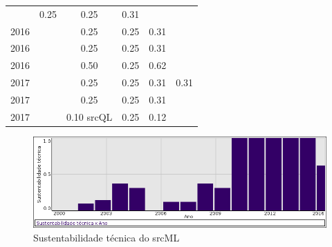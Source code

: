 \begin{table}[H]
\begin{tabular}{| l | c | c | c | c | c |}
          &
          0.25
          &
          0.25
          &
          0.31
          &
          \\
            2016
          &
          
          &
          0.25
          &
          0.25
          &
          0.31
          &
          \\
            2016
          &
          
          &
          0.25
          &
          0.25
          &
          0.31
          &
          \\
            2016
          &
          
          &
          0.50
          &
          0.25
          &
          0.62
          &
          \\
\hline
            2017
          &
          
          &
          0.25
          &
          0.25
          &
          0.31
          &
            {\color{red} 0.31}
          \\
            2017
          &
          
          &
          0.25
          &
          0.25
          &
          0.31
          &
          \\
            2017
          &
          
          &
          0.10
            {\tiny srcQL}
          &
          0.25
          &
          0.12
          &
          \\
\hline
\end{tabular}
\end{table}

\begin{figure}[h]
  \center
  \includegraphics[scale=0.50]{result-documents/charts/srcml.png}
  \caption{Sustentabilidade técnica do srcML}
\end{figure}



